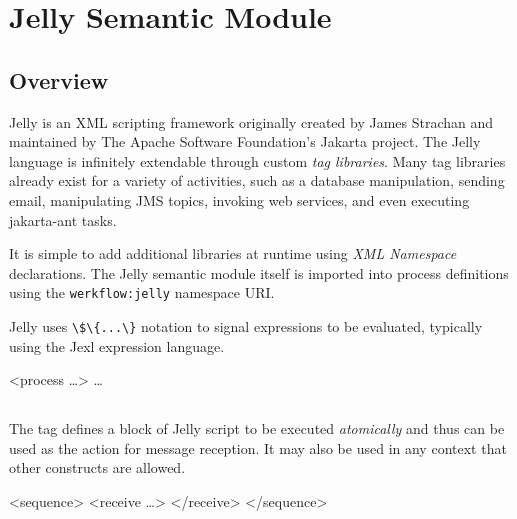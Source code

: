 \chapter{Jelly Semantic Module}

\section{Overview}

Jelly is an XML scripting framework originally created by
James Strachan and maintained by The Apache Software Foundation's
Jakarta project.  The Jelly language is infinitely extendable
through custom \emph{tag libraries}.  Many tag libraries
already exist for a variety of activities, such as a database
manipulation, sending email, manipulating JMS topics, invoking
web services, and even executing jakarta-ant tasks.

It is simple to add additional libraries at runtime using
\emph{XML Namespace} declarations.  The Jelly semantic
module itself is imported into process definitions using
the \verb|werkflow:jelly| namespace URI.

Jelly uses \verb|\$\{...\}| notation to signal expressions
to be evaluated, typically using the Jexl expression language.

\begin{codelisting}
<process  \dots>
    \dots
\end{codelisting}


\section{}

The  tag defines a block of Jelly script
to be executed \emph{atomically} and thus can be used
as the action for message reception.  It may also be used
in any context that other constructs are allowed.

\begin{codelisting}
<sequence>
    <receive \dots>
    </receive>
</sequence>
\end{codelisting}


